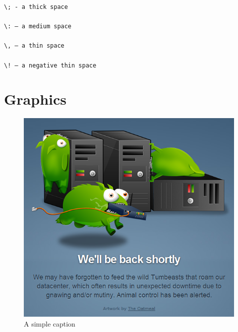 \documentclass[a4paper,10pt,twocolumn,usenames,dvipsnames]{article}
\begin{document}
  \begin{verbatim}
\; - a thick space

\: – a medium space

\, – a thin space

\! – a negative thin space 
  \end{verbatim}

\section{Graphics}
  \begin{figure}[ht!]
    \centering
    \includegraphics[scale=0.42]{tumbeasts.png}
    \caption{A simple caption}
    \label{overflow}
  \end{figure}


\end{document}
